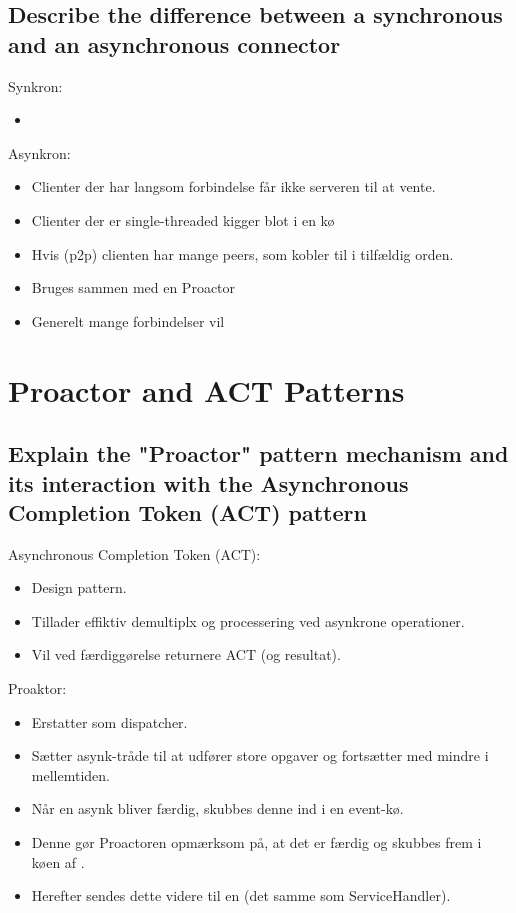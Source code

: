 \documentclass{article}
\begin{document}
\subsection{Describe the difference between a synchronous and an asynchronous connector}
Synkron:
\vspace{-10pt}
\begin{itemize}
	\item 
\end{itemize}

Asynkron:
\vspace{-10pt}
\begin{itemize}
	\item Clienter der har langsom forbindelse får ikke serveren til at vente.
	\item Clienter der er single-threaded kigger blot i en kø 
	\item Hvis (p2p) clienten har mange peers, som kobler til i tilfældig orden.
	\item Bruges sammen med en Proactor
	\item Generelt mange forbindelser vil 
\end{itemize}







\newpage
\section{Proactor and ACT Patterns}

\subsection{Explain the "Proactor" pattern mechanism and its interaction with the  
Asynchronous Completion Token (ACT) pattern}

Asynchronous Completion Token (ACT):
\vspace{-10pt}
\begin{itemize}
	\item Design pattern.
	\item Tillader effiktiv demultiplx og processering ved asynkrone operationer.
	\item Vil ved færdiggørelse returnere ACT (og resultat).
\end{itemize}

Proaktor:
\vspace{-10pt}
\begin{itemize}
	\item Erstatter  som dispatcher.
	\item Sætter asynk-tråde til at udfører store opgaver og fortsætter med mindre i mellemtiden.
	\item Når en asynk bliver færdig, skubbes denne ind i en event-kø. 
	\item Denne gør Proactoren opmærksom på, at det er færdig og skubbes frem i køen af .
	\item Herefter sendes dette videre til en  (det samme som ServiceHandler).
\end{itemize}
\end{document}
